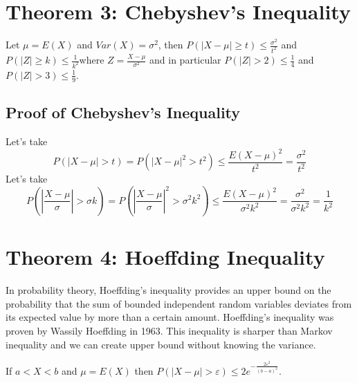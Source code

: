 \documentclass[
]{article}
\begin{document}
\hypertarget{theorem-3-chebyshevs-inequality}{%
\section{Theorem 3: Chebyshev's
Inequality}\label{theorem-3-chebyshevs-inequality}}

Let \(\mu =E\left( X \right)\) and
\(Var\left( X \right)={{\sigma }^{2}}\), then
\(P\left( \left| X-\mu \right|\ge t \right)\le \frac{{{\sigma }^{2}}}{{{t}^{2}}}\)
and
\(P\left( \left| Z \right|\ge k \right)\le \frac{1}{{{k}^{2}}}\)where
\(Z=\frac{X-\mu }{{{\sigma }^{2}}}\) and in particular
\(P\left( \left| Z \right|>2 \right)\le \frac{1}{4}\) and
\(P\left( \left| Z \right|>3 \right)\le \frac{1}{9}\).

\hypertarget{proof-of-chebyshevs-inequality}{%
\subsection{Proof of Chebyshev's
Inequality}\label{proof-of-chebyshevs-inequality}}

Let's take
\[P\left( \left| X-\mu  \right|>t \right)=P\left( {{\left| X-\mu  \right|}^{2}}>{{t}^{2}} \right)\le \frac{E{{\left( X-\mu  \right)}^{2}}}{{{t}^{2}}}=\frac{{{\sigma }^{2}}}{{{t}^{2}}}\]
Let's take
\[P\left( \left| \frac{X-\mu }{\sigma } \right|>\sigma k \right)=P\left( {{\left| \frac{X-\mu }{\sigma } \right|}^{2}}>{{\sigma }^{2}}{{k}^{2}} \right)\le \frac{E{{\left( X-\mu  \right)}^{2}}}{{{\sigma }^{2}}{{k}^{2}}}=\frac{{{\sigma }^{2}}}{{{\sigma }^{2}}{{k}^{2}}}=\frac{1}{{{k}^{2}}}\]

\hypertarget{theorem-4-hoeffding-inequality}{%
\section{Theorem 4: Hoeffding
Inequality}\label{theorem-4-hoeffding-inequality}}

In probability theory, Hoeffding's inequality provides an upper bound on
the probability that the sum of bounded independent random variables
deviates from its expected value by more than a certain amount.
Hoeffding's inequality was proven by Wassily Hoeffding in 1963. This
inequality is sharper than Markov inequality and we can create upper
bound without knowing the variance.

If \(a<X<b\) and \(\mu =E\left( X \right)\) then
\(P\left( \left| X-\mu \right|>\varepsilon \right)\le 2{{e}^{-\frac{2{{\varepsilon }^{2}}}{{{\left( b-a \right)}^{2}}}}}\).
\end{document}
